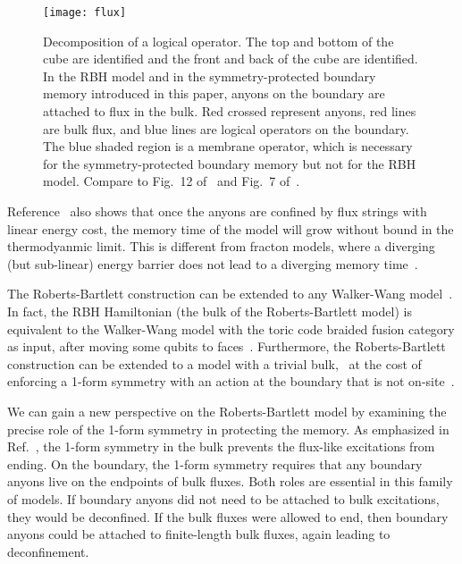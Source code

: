 \begin{figure}[th!]
    \centering
    \texttt{[image: flux]}
    \caption[Decomposition of a logical operator]{Decomposition of a logical operator. The top and bottom of the cube are identified and the front and back of the cube are identified. In the RBH model and in the symmetry-protected boundary memory introduced in this paper, anyons on the boundary are attached to flux in the bulk. Red crossed represent anyons, red lines are bulk flux, and blue lines are logical operators on the boundary. The blue shaded region is a membrane operator, which is necessary for the symmetry-protected boundary memory but not for the RBH model. Compare to Fig.~12 of~\cite{RobertsBartlett2020} and Fig.~7 of~\cite{StahlNandkishore2021}.}
    \label{fig:flux}
\end{figure}

Reference~\cite{RobertsBartlett2020} also shows that once the anyons are confined by flux strings with linear energy cost, the memory time of the model will grow without bound in the thermodyanmic limit. This is different from fracton models, where a diverging (but sub-linear) energy barrier does not lead to a diverging memory time~\cite{Siva2017Marginally}.

The Roberts-Bartlett construction can be extended to any Walker-Wang model~\cite{WalkerWang2011, vonKeyserlingk2013SurfaceAnyons}. In fact, the RBH Hamiltonian (the bulk of the Roberts-Bartlett model) is equivalent to the Walker-Wang model with the toric code braided fusion category as input, after moving some qubits to faces~\cite{Roberts20203Fermion}. Furthermore, the Roberts-Bartlett construction can be extended to a model with a trivial bulk,~\cite{StahlNandkishore2021} at the cost of enforcing a 1-form symmetry with an action at the boundary that is not on-site~\cite{Wen2019Higher}. 

We can gain a new perspective on the Roberts-Bartlett model by examining the precise role of the 1-form symmetry in protecting the memory. As emphasized in Ref.~\cite{RobertsBartlett2020}, the 1-form symmetry in the bulk prevents the flux-like excitations from ending. On the boundary, the 1-form symmetry requires that any boundary anyons live on the endpoints of bulk fluxes. Both roles are essential in this family of models. If boundary anyons did not need to be attached to bulk excitations, they would be deconfined. If the bulk fluxes were allowed to end, then boundary anyons could be attached to finite-length bulk fluxes, again leading to deconfinement.

